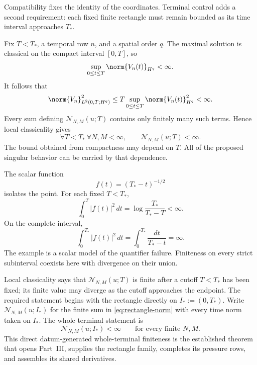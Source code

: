 Compatibility fixes the identity of the coordinates.  Terminal control adds a
second requirement: each fixed finite rectangle must remain bounded as its
time interval approaches \(T_*\).

Fix \(T<T_*\), a temporal row \(n\), and a spatial order \(q\).  The maximal
solution is classical on the compact interval \([0,T]\), so
\begin{equation*}
 \sup_{0\le t\le T}\norm{V_n(t)}_{H^q}<\infty.
\end{equation*}
It follows that
\begin{equation*}
 \norm{V_n}_{L^2(0,T;H^q)}^2
 \le T\sup_{0\le t\le T}\norm{V_n(t)}_{H^q}^2
 <\infty.
\end{equation*}
Every sum defining \(\mathcal N_{N,M}(u;T)\) contains only finitely many such
terms.  Hence local classicality gives
\begin{equation}
 \forall T<T_*\ \forall N,M<\infty,
 \qquad
 \mathcal N_{N,M}(u;T)<\infty.
 \label{eq:strict-subinterval-rectangles}
\end{equation}
The bound obtained from compactness may depend on \(T\).  All of the proposed
singular behavior can be carried by that dependence.

The scalar function
\begin{equation*}
 f(t)=(T_*-t)^{-1/2}
\end{equation*}
isolates the point.  For each fixed \(T<T_*\),
\begin{equation*}
 \int_0^T|f(t)|^2\,dt
 =\log\frac{T_*}{T_*-T}<\infty.
\end{equation*}
On the complete interval,
\begin{equation*}
 \int_0^{T_*}|f(t)|^2\,dt
 =\int_0^{T_*}\frac{dt}{T_*-t}
 =\infty.
\end{equation*}
The example is a scalar model of the quantifier failure.  Finiteness on every
strict subinterval coexists here with divergence on their union.

Local classicality says that \(\mathcal N_{N,M}(u;T)\) is finite after a cutoff
\(T<T_*\) has been fixed; its finite value may diverge as the cutoff approaches
the endpoint.  The required statement begins with the rectangle
directly on \(I_*:=(0,T_*)\).  Write \(\mathcal N_{N,M}(u;I_*)\) for the finite sum in
\eqref{eq:rectangle-norm} with every time norm taken on \(I_*\).  The
whole-terminal statement is
\begin{equation}
 \mathcal N_{N,M}(u;I_*)<\infty
 \qquad\text{for every finite }N,M.
 \label{eq:whole-terminal-quantifier}
\end{equation}
This direct datum-generated whole-terminal finiteness is the established theorem that opens
Part~III, supplies the rectangle family, completes its pressure rows, and
assembles its shared derivatives.
